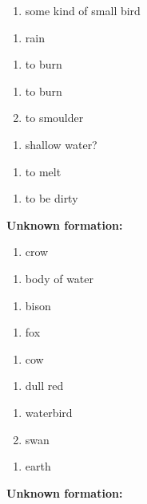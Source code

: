 \begin{enumerate}
\item some kind of small bird
\end{enumerate}
\begin{enumerate}
\item rain
\end{enumerate}
\begin{enumerate}
\item to burn
\end{enumerate}
\begin{enumerate}
\item to burn
\item to smoulder
\end{enumerate}
\begin{enumerate}
\item shallow water?
\end{enumerate}
\begin{enumerate}
\item to melt
\end{enumerate}
\begin{enumerate}
\item to be dirty
\end{enumerate}
\noindent\textbf{Unknown formation:}\\

\begin{enumerate}
\item crow
\end{enumerate}
\begin{enumerate}
\item body of water
\end{enumerate}
\begin{enumerate}
\item bison
\end{enumerate}
\begin{enumerate}
\item fox
\end{enumerate}
\begin{enumerate}
\item cow
\end{enumerate}
\begin{enumerate}
\item dull red
\end{enumerate}
\begin{enumerate}
\item waterbird
\item swan
\end{enumerate}
\begin{enumerate}
\item earth
\end{enumerate}
\noindent\textbf{Unknown formation:}\\

